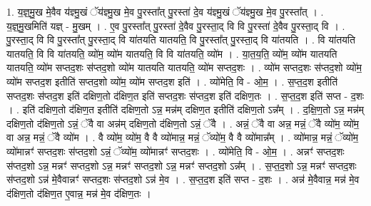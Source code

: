\documentclass[17pt]{extarticle}
\begin{document}
1. य॒ज्ञ्॒मु॒ख मे॒वैव य॑ज्ञ्मु॒खं ॅय॑ज्ञ्मु॒ख मे॒व पु॒रस्ता᳚त् पु॒रस्ता॑ दे॒व य॑ज्ञ्मु॒खं ॅय॑ज्ञ्मु॒ख मे॒व पु॒रस्ता᳚त् । . य॒ज्ञ्॒मु॒खमिति॑ यज्ञ् - मु॒खम् । . ए॒व पु॒रस्ता᳚त् पु॒रस्ता॑ दे॒वैव पु॒रस्ता॒द् वि वि पु॒रस्ता॑ दे॒वैव पु॒रस्ता॒द् वि । . पु॒रस्ता॒द् वि वि पु॒रस्ता᳚त् पु॒रस्ता॒द् वि या॑तयति यातयति॒ वि पु॒रस्ता᳚त् पु॒रस्ता॒द् वि या॑तयति । . वि या॑तयति यातयति॒ वि वि या॑तयति॒ व्यो॑म॒ व्यो॑म यातयति॒ वि वि या॑तयति॒ व्यो॑म । . या॒त॒य॒ति॒ व्यो॑म॒ व्यो॑म यातयति यातयति॒ व्यो॑म सप्तद॒शः स॑प्तद॒शो व्यो॑म यातयति यातयति॒ व्यो॑म सप्तद॒शः । . व्यो॑म सप्तद॒शः स॑प्तद॒शो व्यो॑म॒ व्यो॑म सप्तद॒श इतीति॑ सप्तद॒शो व्यो॑म॒ व्यो॑म सप्तद॒श इति॑ । . व्यो॑मेति॒ वि - ओ॒म॒ । . स॒प्त॒द॒श इतीति॑ सप्तद॒शः स॑प्तद॒श इति॑ दक्षिण॒तो द॑क्षिण॒त इति॑ सप्तद॒शः स॑प्तद॒श इति॑ दक्षिण॒तः । . स॒प्त॒द॒श इति॑ सप्त - द॒शः । . इति॑ दक्षिण॒तो द॑क्षिण॒त इतीति॑ दक्षिण॒तो ऽन्न॒ मन्न॑म् दक्षिण॒त इतीति॑ दक्षिण॒तो ऽन्न᳚म् । . द॒क्षि॒ण॒तो ऽन्न॒ मन्न॑म् दक्षिण॒तो द॑क्षिण॒तो ऽन्नं॒ ॅवै वा अन्न॑म् दक्षिण॒तो द॑क्षिण॒तो ऽन्नं॒ ॅवै । . अन्नं॒ ॅवै वा अन्न॒ मन्नं॒ ॅवै व्यो॑म॒ व्यो॑म॒ वा अन्न॒ मन्नं॒ ॅवै व्यो॑म । . वै व्यो॑म॒ व्यो॑म॒ वै वै व्यो॑मान्न॒ मन्नं॒ ॅव्यो॑म॒ वै वै व्यो॑मान्न᳚म् । . व्यो॑मान्न॒ मन्नं॒ ॅव्यो॑म॒ व्यो॑मान्नꣳ॑ सप्तद॒शः स॑प्तद॒शो ऽन्नं॒ ॅव्यो॑म॒ व्यो॑मान्नꣳ॑ सप्तद॒शः । . व्यो॑मेति॒ वि - ओ॒म॒ । . अन्नꣳ॑ सप्तद॒शः स॑प्तद॒शो ऽन्न॒ मन्नꣳ॑ सप्तद॒शो ऽन्न॒ मन्नꣳ॑ सप्तद॒शो ऽन्न॒ मन्नꣳ॑ सप्तद॒शो ऽन्न᳚म् । . स॒प्त॒द॒शो ऽन्न॒ मन्नꣳ॑ सप्तद॒शः स॑प्तद॒शो ऽन्न॑ मे॒वैवान्नꣳ॑ सप्तद॒शः स॑प्तद॒शो ऽन्न॑ मे॒व । . स॒प्त॒द॒श इति॑ सप्त - द॒शः । . अन्न॑ मे॒वैवान्न॒ मन्न॑ मे॒व द॑क्षिण॒तो द॑क्षिण॒त ए॒वान्न॒ मन्न॑ मे॒व द॑क्षिण॒तः । \newline
\end{document}
